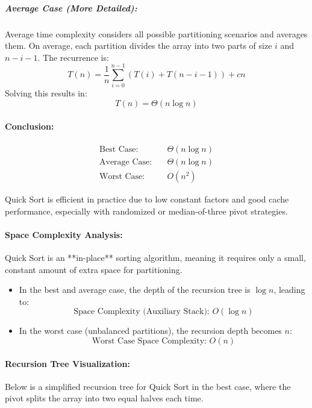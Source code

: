 \subparagraph{Average Case (More Detailed):}
Average time complexity considers all possible partitioning scenarios and averages them. On average, each partition divides the array into two parts of size \( i \) and \( n - i - 1 \). The recurrence is:
\[
T(n) = \frac{1}{n} \sum_{i=0}^{n-1} \left(T(i) + T(n-i-1)\right) + cn
\]
Solving this results in:
\[
T(n) = \Theta(n \log n)
\]

\paragraph{Conclusion:}
\[
\boxed{
\begin{aligned}
\text{Best Case:} & \quad \Theta(n \log n) \\
\text{Average Case:} & \quad \Theta(n \log n) \\
\text{Worst Case:} & \quad O(n^2)
\end{aligned}
}
\]

Quick Sort is efficient in practice due to low constant factors and good cache performance, especially with randomized or median-of-three pivot strategies.

\paragraph{Space Complexity Analysis:}

Quick Sort is an **in-place** sorting algorithm, meaning it requires only a small, constant amount of extra space for partitioning.

\begin{itemize}
  \item In the best and average case, the depth of the recursion tree is \( \log n \), leading to:
  \[
  \boxed{\text{Space Complexity (Auxiliary Stack): } O(\log n)}
  \]
  \item In the worst case (unbalanced partitions), the recursion depth becomes \( n \):
  \[
  \boxed{\text{Worst Case Space Complexity: } O(n)}
  \]
\end{itemize}

\paragraph{Recursion Tree Visualization:}

Below is a simplified recursion tree for Quick Sort in the best case, where the pivot splits the array into two equal halves each time.

